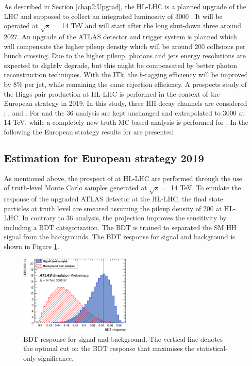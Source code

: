 As described in Section \ref{chap2:Upgrad}, the HL-LHC is a planned upgrade of the LHC and supposed to collect an integrated luminosity of 3000 \ifb. It will be operated at $\sqrt{s} = $ 14 TeV and will start after the long shut-down three around 2027. An upgrade of the ATLAS detector and trigger system is planned which will compensate the higher pileup density which will be around 200 collisions per bunch crossing. Due to the higher pileup, photons and jets energy resolutions are expected to slightly degrade, but this might be compensated by better photon reconstruction techniques. With the ITk, the $b$-tagging efficiency will be improved by 8\% per jet, while remaining the same rejection efficiency. A prospects study of the Higgs pair production at HL-LHC is performed in the context of the European strategy in 2019. In this study, three HH decay channels are considered : \bbbb, \bbtt and \bbyy. For \bbbb and \bbtt the 36 \ifb analysis are kept unchanged and extrapolated to 3000 \ifb at 14 TeV, while a completely new truth MC-based analysis is performed for \bbyy. In the following the European strategy results for \HHyybb are presented.

\subsection{Estimation for European strategy 2019}
As mentioned above, the prospect of \HHyybb at HL-LHC are performed through the use of truth-level Monte Carlo samples generated at $\sqrt{s} = $ 14 TeV. To emulate the response of the upgraded ATLAS detector at the HL-LHC, the final state particles at truth level are smeared assuming the pileup density of 200 at HL-LHC. In contrary to 36 \ifb analysis, the projection improves the sensitivity by including a BDT categorization. The BDT is trained to separated the SM HH signal from the backgrounds. The BDT response for signal and background is shown in Figure \ref{fig:HL-LHC:36ifb:BDT}. 

\begin{figure}[htbp]
    \centering
    \includegraphics[width=0.5\textwidth]{Ch6/Img/figures_bbyy_overtrainTestOnly.eps}
    \caption{BDT response for signal and background. The vertical line denotes the optimal cut on the BDT response that maximises the statistical-only significance,}
    \label{fig:HL-LHC:36ifb:BDT}
\end{figure}


